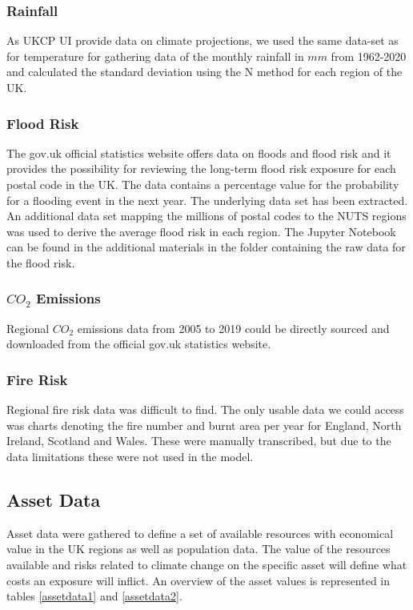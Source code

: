 \documentclass[10pt,a4paper]{article}
\begin{document}
\subsubsection{Rainfall}
As UKCP UI provide data on climate projections, we used the same data-set as for temperature for gathering data of the monthly rainfall in $mm$ from 1962-2020 and calculated the standard deviation using the N method for each region of the UK. \cite{uk}
\subsubsection{Flood Risk}
The gov.uk official statistics website offers data on floods and flood risk and it provides the possibility for reviewing the long-term flood risk exposure for each postal code in the UK. The data contains a percentage value for the probability for a flooding event in the next year. The underlying data set has been extracted. An additional data set mapping the millions of postal codes to the NUTS regions was used to derive the average flood risk in each region. The Jupyter Notebook can be found in the additional materials in the folder containing the raw data for the flood risk. \cite{open,postcode}
\subsubsection{$CO_2$ Emissions}
Regional $CO_2$ emissions data from 2005 to 2019 could be directly sourced and downloaded from the official gov.uk statistics website. \cite{uk,ukc}
\subsubsection{Fire Risk}
Regional fire risk data was difficult to find. The only usable data we could access was charts denoting the fire number and burnt area per year for England, North Ireland, Scotland and Wales. These were manually transcribed, but due to the data limitations these were not used in the model. \cite{countryprofile}


\subsection{Asset Data}
Asset data were gathered to define a set of available resources with economical value in the UK regions as well as population data. The value of the resources available and risks related to climate change on the specific asset will define what costs an exposure will inflict. An overview of the asset values is represented in tables \ref{assetdata1} and \ref{assetdata2}.
\end{document}

